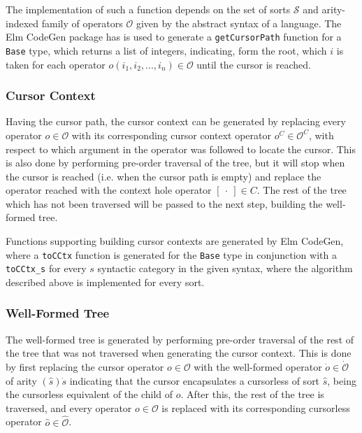 \documentclass[sigplan,screen]{acmart}
\begin{document}
The implementation of such a function depends on the set of sorts $\mathcal{S}$
and arity-indexed family of operators $\mathcal{O}$ given by the abstract syntax
of a language. The Elm CodeGen package\cite{elm-codegen-package} has is used to
generate a \texttt{getCursorPath} function for a \texttt{Base} type, which returns a list of integers, indicating, form the root, which $i$ is taken for each operator $o(i_1,i_2,...,i_n) \in \mathcal{O}$ until the cursor is reached.

\subsubsection{Cursor Context}

Having the cursor path, the cursor context can be generated by replacing every
operator $o \in \mathcal{O}$ with its corresponding cursor context operator
$o^C \in \mathcal{O}^C$, with respect to which argument in the operator was
followed to locate the cursor. This is also done by performing pre-order traversal
of the tree, but it will stop when the cursor is reached (i.e. when the
cursor path is empty) and replace the operator reached with the
context hole operator $[ \ \cdot \ ] \in C$. The rest of the tree which has not
been traversed will be passed to the next step, building the well-formed tree.

Functions supporting building cursor contexts are generated by Elm
CodeGen, where a \texttt{toCCtx} function is generated for the
\texttt{Base} type in conjunction with a \texttt{toCCtx\_s} for every
$s$ syntactic category in the given syntax, where the algorithm
described above is implemented for every sort.

\subsubsection{Well-Formed Tree}

The well-formed tree is generated by performing pre-order traversal of the
rest of the tree that was not traversed when generating the cursor context.
This is done by first replacing the cursor operator $o \in \mathcal{O}$ with the well-formed operator
$\dot{o} \in \dot{\mathcal{O}}$ of arity $(\hat{s})\dot{s}$ indicating that the
cursor encapsulates a cursorless \abt of sort $\hat{s}$, being the cursorless equivalent of the child of $o$.
After this, the rest of the tree is traversed, and every operator $o \in \mathcal{O}$
is replaced with its corresponding cursorless operator $\hat{o} \in \hat{\mathcal{O}}$.
\end{document}
